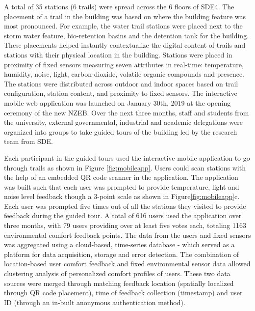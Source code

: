 A total of 35 stations (6 trails) were spread across the 6 floors of SDE4. The placement of a trail in the building was based on where the building feature was most pronounced. For example, the water trail stations were placed next to the storm water feature, bio-retention basins and the detention tank for the building. These placements helped instantly contextualize the digital content of trails and stations with their physical location in the building. Stations were placed in proximity of fixed sensors measuring seven attributes in real-time: temperature, humidity, noise, light, carbon-dioxide, volatile organic compounds and presence. The stations were distributed across outdoor and indoor spaces based on trail configuration, station content, and proximity to fixed sensors. The interactive mobile web application was launched on January 30th, 2019 at the opening ceremony of the new NZEB. Over the next three months, staff and students from the university, external governmental, industrial and academic delegations were organized into groups to take guided tours of the building led by the research team from SDE.

Each participant in the guided tours used the interactive mobile application to go through trails as shown in Figure \ref{fig:mobileapp}. Users could scan stations with the help of an embedded QR code scanner in the application. The application was built such that each user was prompted to provide temperature, light and noise level feedback though a 3-point scale as shown in Figure\ref{fig:mobileapp}c. Each user was prompted five times out of all the stations they visited to provide feedback during the guided tour. A total of 616 users used the application over three months, with 79 users providing over at least five votes each, totaling 1163 environmental comfort feedback points. The data from the users and fixed sensors was aggregated using a cloud-based, time-series database - which served as a platform for data acquisition, storage and error detection. The combination of location-based user comfort feedback and fixed environmental sensor data allowed clustering analysis of personalized comfort profiles of users. These two data sources were merged through matching feedback location (spatially localized through QR code placement), time of feedback collection (timestamp) and user ID (through an in-built anonymous authentication method). 

